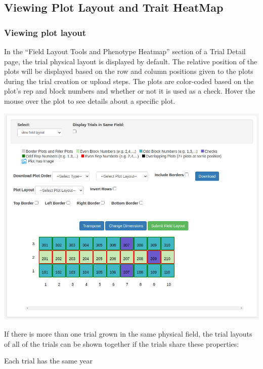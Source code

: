 \documentclass[
  12pt,
]{book}
\begin{document}
\hypertarget{viewing-plot-layout-and-trait-heatmap}{%
\subsection{Viewing Plot Layout and Trait HeatMap}\label{viewing-plot-layout-and-trait-heatmap}}

\hypertarget{viewing-plot-layout}{%
\subsubsection{Viewing plot layout}\label{viewing-plot-layout}}

In the ``Field Layout Tools and Phenotype Heatmap'' section of a Trial Detail page, the trial physical layout is displayed by default. The relative position of the plots will be displayed based on the row and column positions given to the plots during the trial creation or upload steps. The plots are color-coded based on the plot's rep and block numbers and whether or not it is used as a check. Hover the mouse over the plot to see details about a specific plot.

\begin{center}\includegraphics[width=0.95\linewidth]{assets/images/fieldmap_trial_layout} \end{center}

If there is more than one trial grown in the same physical field, the trial layouts of all of the trials can be shown together if the trials share these properties:

Each trial has the same year
\end{document}
